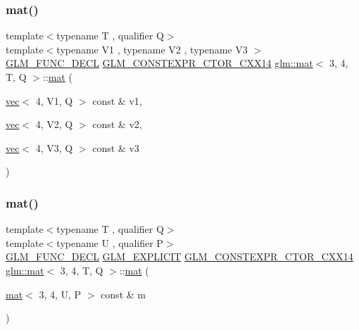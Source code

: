 \subsubsection{\texorpdfstring{mat()}{mat()}\hspace{0.1cm}{\footnotesize\ttfamily [8/21]}}
{\footnotesize\ttfamily template$<$typename T , qualifier Q$>$ \\
template$<$typename V1 , typename V2 , typename V3 $>$ \\
\mbox{\hyperlink{setup_8hpp_ab2d052de21a70539923e9bcbf6e83a51}{G\+L\+M\+\_\+\+F\+U\+N\+C\+\_\+\+D\+E\+CL}} \mbox{\hyperlink{setup_8hpp_a0900f9145e68bf6061b6f5e7be3fa751}{G\+L\+M\+\_\+\+C\+O\+N\+S\+T\+E\+X\+P\+R\+\_\+\+C\+T\+O\+R\+\_\+\+C\+X\+X14}} \mbox{\hyperlink{structglm_1_1mat}{glm\+::mat}}$<$ 3, 4, T, Q $>$\+::\mbox{\hyperlink{structglm_1_1mat}{mat}} (\begin{DoxyParamCaption}\item[{\mbox{\hyperlink{structglm_1_1vec}{vec}}$<$ 4, V1, Q $>$ const \&}]{v1,  }\item[{\mbox{\hyperlink{structglm_1_1vec}{vec}}$<$ 4, V2, Q $>$ const \&}]{v2,  }\item[{\mbox{\hyperlink{structglm_1_1vec}{vec}}$<$ 4, V3, Q $>$ const \&}]{v3 }\end{DoxyParamCaption})}

\mbox{\label{structglm_1_1mat_3_013_00_014_00_01_t_00_01_q_01_4_ab07fea76c961a22e1aa486f9276f2d75}} 
\subsubsection{\texorpdfstring{mat()}{mat()}\hspace{0.1cm}{\footnotesize\ttfamily [9/21]}}
{\footnotesize\ttfamily template$<$typename T , qualifier Q$>$ \\
template$<$typename U , qualifier P$>$ \\
\mbox{\hyperlink{setup_8hpp_ab2d052de21a70539923e9bcbf6e83a51}{G\+L\+M\+\_\+\+F\+U\+N\+C\+\_\+\+D\+E\+CL}} \mbox{\hyperlink{setup_8hpp_a6c74f5a5e7b134ab69023ff9a30d4d5d}{G\+L\+M\+\_\+\+E\+X\+P\+L\+I\+C\+IT}} \mbox{\hyperlink{setup_8hpp_a0900f9145e68bf6061b6f5e7be3fa751}{G\+L\+M\+\_\+\+C\+O\+N\+S\+T\+E\+X\+P\+R\+\_\+\+C\+T\+O\+R\+\_\+\+C\+X\+X14}} \mbox{\hyperlink{structglm_1_1mat}{glm\+::mat}}$<$ 3, 4, T, Q $>$\+::\mbox{\hyperlink{structglm_1_1mat}{mat}} (\begin{DoxyParamCaption}\item[{\mbox{\hyperlink{structglm_1_1mat}{mat}}$<$ 3, 4, U, P $>$ const \&}]{m }\end{DoxyParamCaption})}

